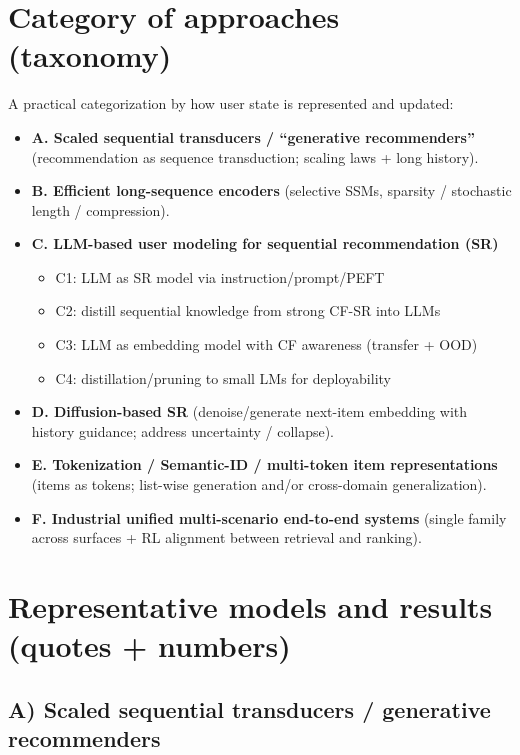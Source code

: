 \documentclass[11pt]{article}
\begin{document}
\section{Category of approaches (taxonomy)}
A practical categorization by how user state is represented and updated:
\begin{itemize}
  \item \textbf{A. Scaled sequential transducers / ``generative recommenders''} (recommendation as sequence transduction; scaling laws + long history).
  \item \textbf{B. Efficient long-sequence encoders} (selective SSMs, sparsity / stochastic length / compression).
  \item \textbf{C. LLM-based user modeling for sequential recommendation (SR)}
    \begin{itemize}
      \item C1: LLM as SR model via instruction/prompt/PEFT
      \item C2: distill sequential knowledge from strong CF-SR into LLMs
      \item C3: LLM as embedding model with CF awareness (transfer + OOD)
      \item C4: distillation/pruning to small LMs for deployability
    \end{itemize}
  \item \textbf{D. Diffusion-based SR} (denoise/generate next-item embedding with history guidance; address uncertainty / collapse).
  \item \textbf{E. Tokenization / Semantic-ID / multi-token item representations} (items as tokens; list-wise generation and/or cross-domain generalization).
  \item \textbf{F. Industrial unified multi-scenario end-to-end systems} (single family across surfaces + RL alignment between retrieval and ranking).
\end{itemize}

\section{Representative models and results (quotes + numbers)}
\subsection{A) Scaled sequential transducers / generative recommenders}
\end{document}
